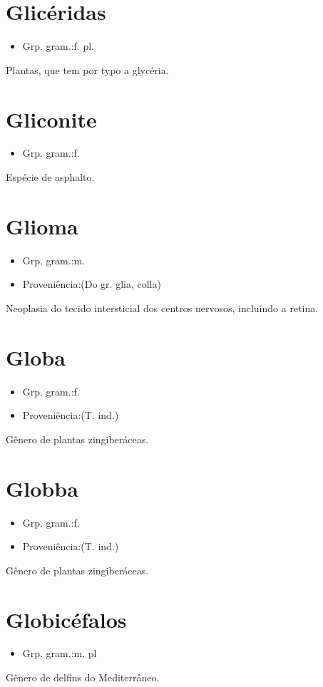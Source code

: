 \section{Glicéridas}
\begin{itemize}
\item {Grp. gram.:f. pl.}
\end{itemize}
Plantas, que tem por typo a glycéria.
\section{Gliconite}
\begin{itemize}
\item {Grp. gram.:f.}
\end{itemize}
Espécie de asphalto.
\section{Glioma}
\begin{itemize}
\item {Grp. gram.:m.}
\end{itemize}
\begin{itemize}
\item {Proveniência:(Do gr. \textunderscore glia\textunderscore , colla)}
\end{itemize}
Neoplasia do tecido intersticial dos centros nervosos, incluindo a retina.
\section{Globa}
\begin{itemize}
\item {Grp. gram.:f.}
\end{itemize}
\begin{itemize}
\item {Proveniência:(T. ind.)}
\end{itemize}
Gênero de plantas zingiberáceas.
\section{Globba}
\begin{itemize}
\item {Grp. gram.:f.}
\end{itemize}
\begin{itemize}
\item {Proveniência:(T. ind.)}
\end{itemize}
Gênero de plantas zingiberáceas.
\section{Globicéfalos}
\begin{itemize}
\item {Grp. gram.:m. pl}
\end{itemize}
Gênero de delfins do Mediterrâneo.
